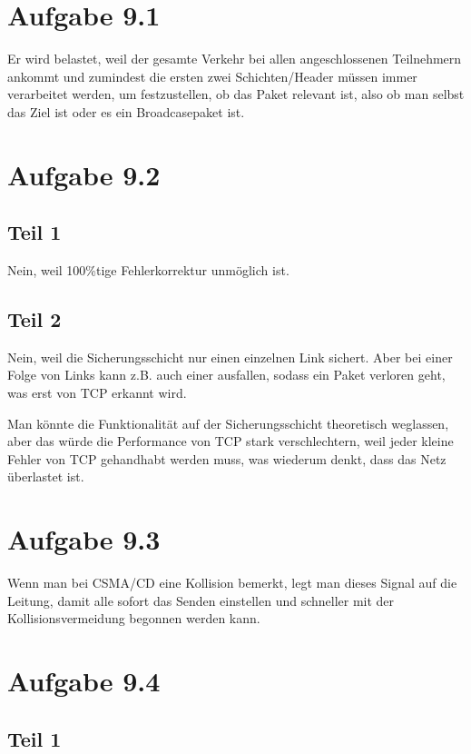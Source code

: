 \documentclass[10pt,a4paper]{article}
\begin{document}
\section{Aufgabe 9.1}

Er wird belastet, weil der gesamte Verkehr bei allen angeschlossenen Teilnehmern
ankommt und zumindest die ersten zwei Schichten/Header müssen immer verarbeitet
werden, um festzustellen, ob das Paket relevant ist, also ob man selbst das Ziel
ist oder es ein Broadcasepaket ist.

\section{Aufgabe 9.2}

\subsection{Teil 1}

Nein, weil 100\%tige Fehlerkorrektur unmöglich ist.

\subsection{Teil 2}

Nein, weil die Sicherungsschicht nur einen einzelnen Link sichert. Aber bei
einer Folge von Links kann z.B. auch einer ausfallen, sodass ein Paket verloren
geht, was erst von TCP erkannt wird.

Man könnte die Funktionalität auf der Sicherungsschicht theoretisch weglassen,
aber das würde die Performance von TCP stark verschlechtern, weil jeder kleine
Fehler von TCP gehandhabt werden muss, was wiederum denkt, dass das Netz
überlastet ist.

\section{Aufgabe 9.3}

Wenn man bei CSMA/CD eine Kollision bemerkt, legt man dieses Signal auf die
Leitung, damit alle sofort das Senden einstellen und schneller mit der
Kollisionsvermeidung begonnen werden kann.

\section{Aufgabe 9.4}

\subsection{Teil 1}
\end{document}
